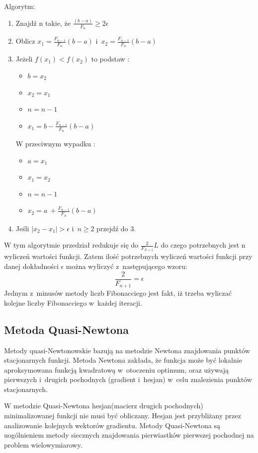 \documentclass{classrep}
\begin{document}
Algorytm:
\begin{enumerate}
\item Znajdź n takie, że $\frac{(b-a)}{F_n}\geq 2\epsilon$
\item Oblicz $x_1 = \frac{F_{n-1}}{F_n}(b-a)$ i~$x_2 = \frac{F_{n-1}}{F_n}(b-a)$
\item  Jeżeli $f(x_1)<f(x_2)$ to podstaw :
	\begin{itemize}
	\item $b=x_2$
	\item $x_2=x_1$
	\item $n=n-1$
	\item $x_1 = b - \frac{F_{n-1}}{F_n}(b-a)$
	\end{itemize}
	W przeciwnym wypadku :
	\begin{itemize}
	\item $a=x_1$
	\item $x_1=x_2$
	\item $n=n-1$
	\item $x_2 = a~+ \frac{F_{n-1}}{F_n}(b-a)$
	\end{itemize}	
	\item Jeśli $|x_2-x_1|>\epsilon$ i~$n \geq 2$ przejdź do 3.
\end{enumerate}

W tym algorytmie przedział redukuje się do $\frac{2}{F_{N+1}} L$ do czego potrzebnych jest n wyliczeń wartości funkcji. Zatem ilość potrzebnych wyliczeń wartości funkcji przy danej dokładności $\epsilon$ można wyliczyć z~następującego wzoru:
\begin{equation}
\frac{2}{F_{n+1}} = \epsilon
\end{equation}
Jednym z~minusów metody liczb Fibonacciego jest fakt, iż trzeba wyliczać kolejne liczby Fibonacciego w~każdej iteracji.

\subsection{Metoda Quasi-Newtona}

Metody quasi-Newtonowskie bazują na metodzie Newtona znajdowania punktów stacjonarnych funkcji. Metoda Newtona zakłada, że funkcja może być lokalnie aproksymowana funkcją kwadratową w~otoczeniu optimum, oraz używają pierwszych i~drugich pochodnych (gradient i~hesjan) w~celu znalezienia punktów stacjonarnych.

W metodzie Quasi-Newtona hesjan(macierz drugich pochodnych) minimalizowanej funkcji nie musi być obliczany. Hesjan jest przybliżany przez analizowanie kolejnych wektorów gradientu. Metody Quasi-Newtona są uogólnieniem metody siecznych znajdowania pierwiastków pierwszej pochodnej na problem wielowymiarowy.
\end{document}

